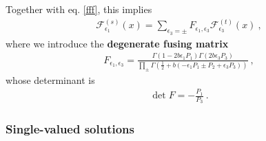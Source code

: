 \documentclass[12pt, a4paper, notitlepage, twoside]{report}
\numberwithin{equation}{section}
\theoremstyle{break}
\begin{document}
Together with eq. \eqref{fff}, this implies 
\begin{align}
 \mathcal{F}^{(s)}_{\epsilon_1}(x) = \sum_{\epsilon_3=\pm} F_{\epsilon_1,\epsilon_3} \mathcal{F}^{(t)}_{\epsilon_3}(x)\ ,
\label{gfg}
\end{align}
where we introduce the \textbf{degenerate fusing matrix} 
\begin{align}
F_{\epsilon_1,\epsilon_3} = \frac{\Gamma(1-2b\epsilon_1P_1)\Gamma(2b\epsilon_3P_3)}{\prod_\pm \Gamma(\frac12+b(-\epsilon_1P_1\pm P_2+\epsilon_3P_3))}\ ,
\label{fmd}
\end{align}
whose determinant is 
\begin{align}
 \det F = -\frac{P_1}{P_3}\ .
\label{detf}
\end{align}

\subsubsection{Single-valued solutions}
\end{document}
